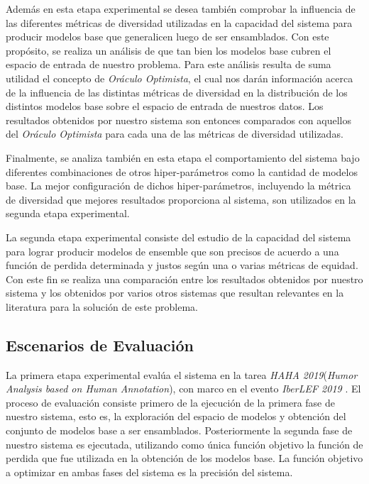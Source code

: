 Además en esta etapa experimental se desea también comprobar la influencia de las diferentes métricas de diversidad utilizadas en la capacidad del sistema para producir modelos base que generalicen luego de ser ensamblados.
Con este propósito, se realiza un análisis de que tan bien los modelos base cubren el espacio de entrada de nuestro problema.
Para este análisis resulta de suma utilidad el concepto de \emph{Oráculo Optimista}, el cual nos darán información acerca de la influencia de las distintas métricas de diversidad en la distribución de los distintos modelos base sobre el espacio de entrada de nuestros datos.
Los resultados obtenidos por nuestro sistema son entonces comparados con aquellos del \emph{Oráculo Optimista} para cada una de las métricas de diversidad utilizadas.

Finalmente, se analiza también en esta etapa el comportamiento del sistema bajo diferentes combinaciones de otros hiper-parámetros como la cantidad de modelos base.
La mejor configuración de dichos hiper-parámetros, incluyendo la métrica de diversidad que mejores resultados proporciona al sistema, son utilizados en la segunda etapa experimental.

La segunda etapa experimental consiste del estudio de la capacidad del sistema para lograr producir modelos de ensemble que son precisos de acuerdo a una función de perdida determinada y justos según una o varias métricas de equidad. 
Con este fin se realiza una comparación entre los resultados obtenidos por nuestro sistema y los obtenidos por varios otros sistemas que resultan relevantes en la literatura para la solución de este problema.

\subsection{Escenarios de Evaluación}\label{section:evaluation-scenaries}

La primera etapa experimental evalúa el sistema en la tarea \emph{HAHA 2019}(\textit{Humor Analysis based on Human Annotation}), con marco en el evento \textit{IberLEF 2019} \parencite{chiruzzo2019overview}.
El proceso de evaluación consiste primero de la ejecución de la primera fase de nuestro sistema, esto es, la exploración del espacio de modelos y obtención del conjunto de modelos base a ser ensamblados.
Posteriormente la segunda fase de nuestro sistema es ejecutada, utilizando como única función objetivo la función de perdida que fue utilizada en la obtención de los modelos base.
La función objetivo a optimizar en ambas fases del sistema es la precisión del sistema.

